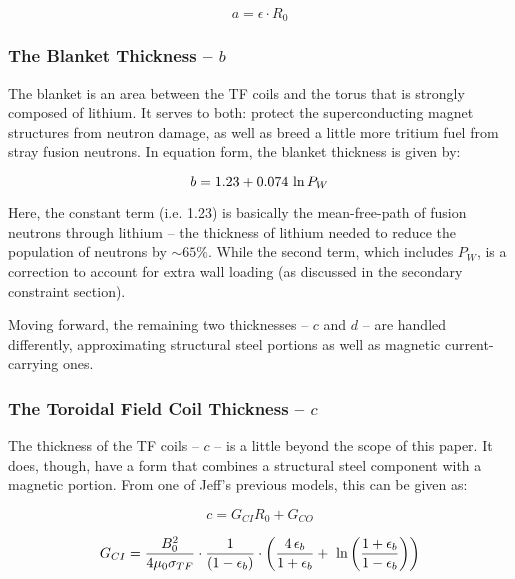 \begin{equation}
	\label{eq:aa}
	a = \epsilon \cdot R_0
\end{equation}
 
\subsubsection{The Blanket Thickness -- $b$}

The blanket is an area between the TF coils and the torus that is strongly composed of lithium. It serves to both: protect the superconducting magnet structures from neutron damage, as well as breed a little more tritium fuel from stray fusion neutrons. In equation form, the blanket thickness is given by:

\begin{equation}
	\label{eq:bb}
	b = 1.23 + 0.074 \ \textnormal{ln} \, P_W
\end{equation}

Here, the constant term (i.e. 1.23) is basically the mean-free-path of fusion neutrons through lithium -- the thickness of lithium needed to reduce the population of neutrons by $\sim 65\%$. While the second term, which includes $P_W$, is a correction to account for extra wall loading (as discussed in the secondary constraint section). 

Moving forward, the remaining two thicknesses -- $c$ and $d$ -- are handled differently, approximating structural steel portions as well as magnetic current-carrying ones.



\subsubsection{The Toroidal Field Coil Thickness -- $c$}

The thickness of the TF coils -- $c$ -- is a little beyond the scope of this paper. It does, though, have a form that combines a structural steel component with a magnetic portion. From one of Jeff's previous models, this can be given as:

\begin{equation}
	\label{eq:cc}
	c = G_{CI} R_0 + G_{CO}
\end{equation}

\begin{equation}
	G_{CI} = \frac{B_{0}^2}{ 4 \mu_0 \sigma_{TF} } \cdot \frac{1}{ ( 1 - \epsilon_b )}  \cdot \left( \frac{ 4 \, \epsilon_b}{1+\epsilon_b} + \ \textnormal{ln} \left( \frac{1+\epsilon_b}{1-\epsilon_b} \right) \right) 
\end{equation}

